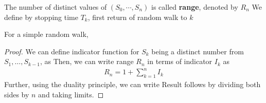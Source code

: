 \documentclass[a4paper,10pt,english]{article}
\begin{document}
The number of distinct values of $(S_0,\cdots, S_n)$ is called \textbf{range}, denoted by $R_n$
We define by stopping time $T_k$, first return of random walk to $k$
\begin{prop}
For a simple random walk, 
\end{prop}
\begin{proof}
We can define indicator function for $S_k$ being a distinct number from $S_1, \dots, S_{k-1}$, as
Then, we can write range $R_n$ in terms of indicator $I_k$ as 
\begin{align*}R_n = 1 + \sum_{k=1}^nI_k\end{align*}
Further, using the duality principle, we can write
Result follows by dividing both sides by $n$ and taking limits.
\end{proof}

\end{document}
